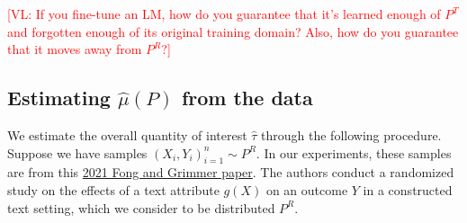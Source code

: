 \documentclass{article}
\newcommand{\vl}[1]{\textcolor{red}{[VL: #1]}}
\begin{document}
	\vl{If you fine-tune an LM, how do you guarantee that it's learned enough of $P^T$ and forgotten enough of its original training domain? Also, how do you guarantee that it moves away from $P^R$?}
	
	\subsection{Estimating $\hat{\mu}(P)$ from the data}
	
	We estimate the overall quantity of interest $\hat{\tau}$ through the following procedure. Suppose we have samples $(X_i,Y_i)_{i=1}^n \sim P^R$. In our experiments, these samples are from this \href{https://onlinelibrary.wiley.com/doi/full/10.1111/ajps.12649}{2021 Fong and Grimmer paper}. The authors conduct a randomized study on the effects of a text attribute $g(X)$ on an outcome $Y$ in a constructed text setting, which we consider to be distributed $P^R$.
	
\end{document}
